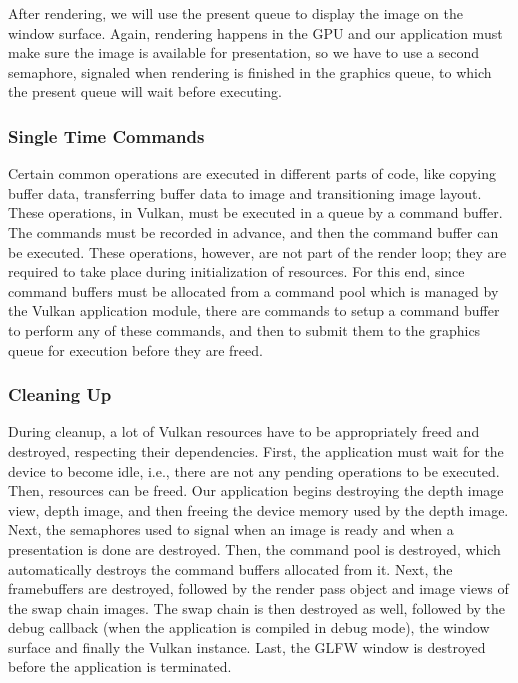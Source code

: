 After rendering, we will use the present queue to display the image on the window surface. Again, rendering happens in the GPU and our application must make sure the image is available for presentation, so we have to use a second semaphore, signaled when rendering is finished in the graphics queue, to which the present queue will wait before executing.

\subsubsection{Single Time Commands}
Certain common operations are executed in different parts of code, like copying buffer data, transferring buffer data to image and transitioning image layout. These operations, in Vulkan, must be executed in a queue by a command buffer. The commands must be recorded in advance, and then the command buffer can be executed. These operations, however, are not part of the render loop; they are required to take place during initialization of resources. For this end, since command buffers must be allocated from a command pool which is managed by the Vulkan application module, there are commands to setup a command buffer to perform any of these commands, and then to submit them to the graphics queue for execution before they are freed.

\subsubsection{Cleaning Up}
During cleanup, a lot of Vulkan resources have to be appropriately freed and destroyed, respecting their dependencies. First, the application must wait for the device to become idle, i.e., there are not any pending operations to be executed. Then, resources can be freed. Our application begins destroying the depth image view, depth image, and then freeing the device memory used by the depth image. Next, the semaphores used to signal when an image is ready and when a presentation is done are destroyed. Then, the command pool is destroyed, which automatically destroys the command buffers allocated from it. Next, the framebuffers are destroyed, followed by the render pass object and image views of the swap chain images. The swap chain is then destroyed as well, followed by the debug callback (when the application is compiled in debug mode), the window surface and finally the Vulkan instance. Last, the GLFW window is destroyed before the application is terminated.
